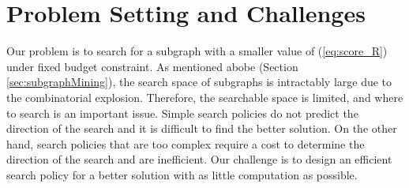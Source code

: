 \section{Problem Setting and Challenges}
Our problem is to search for a subgraph 
with a smaller value of (\ref{eq:score_R}) under fixed budget constraint.
As mentioned abobe (Section \ref{sec:subgraphMining}), 
the search space of subgraphs is intractably large due to the combinatorial explosion.
Therefore, the searchable space is limited, and where to search is an important issue.
Simple search policies do not predict the direction of the search 
and it is difficult to find the better solution.
On the other hand, search policies that are too complex 
require a cost to determine the direction of the search and are inefficient.
Our challenge is to design an efficient search policy for a better solution 
 with as little computation as possible.

